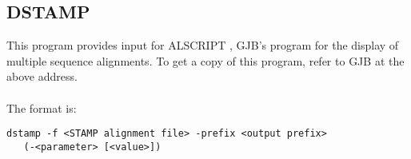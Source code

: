 \subsection{DSTAMP}

This program provides input for ALSCRIPT \cite{barton93a}, GJB's program
for the display of multiple sequence alignments.  To get a copy of
this program, refer to GJB at the above address.  \\
\\
The format is:\\

\begin{scriptsize}\begin{verbatim}
dstamp -f <STAMP alignment file> -prefix <output prefix> 
   (-<parameter> [<value>])
\end{verbatim} \end{scriptsize}

